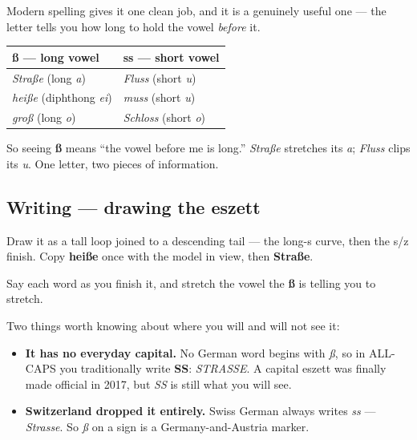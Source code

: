 \begin{grammarlens}[title={Grammar Lens: ß after long, ss after short}]
Modern spelling gives it one clean job, and it is a genuinely useful one — the letter tells you how long to hold the vowel \emph{before} it.

\noindent
\begin{tabularx}{\linewidth}{@{}>{\raggedright\arraybackslash}X>{\raggedright\arraybackslash}X@{}}
\toprule
\textbf{ß — long vowel} & \textbf{ss — short vowel} \\
\midrule
\emph{Straße} (long \emph{a}) & \emph{Fluss} (short \emph{u}) \\
\emph{heiße} (diphthong \emph{ei}) & \emph{muss} (short \emph{u}) \\
\emph{groß} (long \emph{o}) & \emph{Schloss} (short \emph{o}) \\
\bottomrule
\end{tabularx}

So seeing \textbf{ß} means \textquotedblleft{}the vowel before me is long.\textquotedblright{} \emph{Straße} stretches its \emph{a}; \emph{Fluss} clips its \emph{u}. One letter, two pieces of information.
\end{grammarlens}

\subsection*{Writing — drawing the eszett}

Draw it as a tall loop joined to a descending tail — the long-s curve, then the s/z finish. Copy \textbf{heiße} once with the model in view, then \textbf{Straße}.

Say each word as you finish it, and stretch the vowel the \textbf{ß} is telling you to stretch.

\begin{culture}
Two things worth knowing about where you will and will not see it:

\begin{itemize}
\raggedright
  \item \textbf{It has no everyday capital.} No German word begins with \emph{ß}, so in ALL-CAPS you traditionally write \textbf{SS}: \emph{STRASSE}. A capital eszett was finally made official in 2017, but \emph{SS} is still what you will see.
  \item \textbf{Switzerland dropped it entirely.} Swiss German always writes \emph{ss} — \emph{Strasse}. So \emph{ß} on a sign is a Germany-and-Austria marker.
\end{itemize}
\end{culture}

